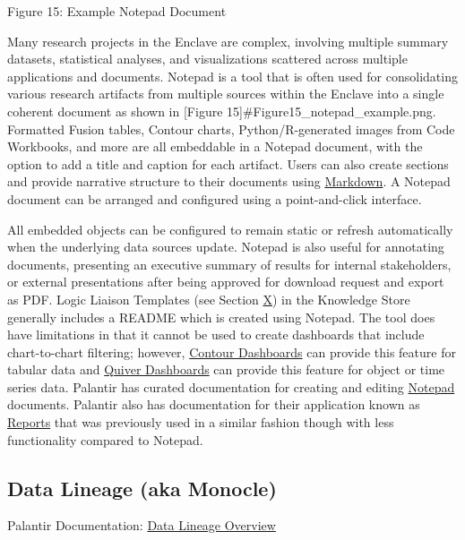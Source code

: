 \documentclass[
  letterpaper,
  DIV=11,
  numbers=noendperiod]{scrreprt}
\begin{document}
Figure 15: Example Notepad Document

Many research projects in the Enclave are complex, involving multiple
summary datasets, statistical analyses, and visualizations scattered
across multiple applications and documents. Notepad is a tool that is
often used for consolidating various research artifacts from multiple
sources within the Enclave into a single coherent document as shown in
{[}Figure 15{]}\#Figure15\_notepad\_example.png. Formatted Fusion
tables, Contour charts, Python/R-generated images from Code Workbooks,
and more are all embeddable in a Notepad document, with the option to
add a title and caption for each artifact. Users can also create
sections and provide narrative structure to their documents using
\href{https://www.markdownguide.org/}{Markdown}. A Notepad document can
be arranged and configured using a point-and-click interface.

All embedded objects can be configured to remain static or refresh
automatically when the underlying data sources update. Notepad is also
useful for annotating documents, presenting an executive summary of
results for internal stakeholders, or external presentations after being
approved for download request and export as PDF. Logic Liaison Templates
(see Section
\protect\hyperlink{Logic-Liaison-Fact-Tables-and-Templates}{X}) in the
Knowledge Store generally includes a README which is created using
Notepad. The tool does have limitations in that it cannot be used to
create dashboards that include chart-to-chart filtering; however,
\href{https://www.palantir.com/docs/foundry/contour/dashboards-overview/}{Contour
Dashboards} can provide this feature for tabular data and
\href{https://www.palantir.com/docs/foundry/quiver/dashboards-overview/}{Quiver
Dashboards} can provide this feature for object or time series data.
Palantir has curated documentation for creating and editing
\href{https://www.palantir.com/docs/foundry/notepad/overview/}{Notepad}
documents. Palantir also has documentation for their application known
as
\href{https://www.palantir.com/docs/foundry/reports/overview/}{Reports}
that was previously used in a similar fashion though with less
functionality compared to Notepad.

\hypertarget{data-lineage-aka-monocle}{%
\subsection{Data Lineage (aka Monocle)}\label{data-lineage-aka-monocle}}

Palantir Documentation:
\href{https://www.palantir.com/docs/foundry/data-lineage/overview/}{Data
Lineage Overview}
\end{document}
